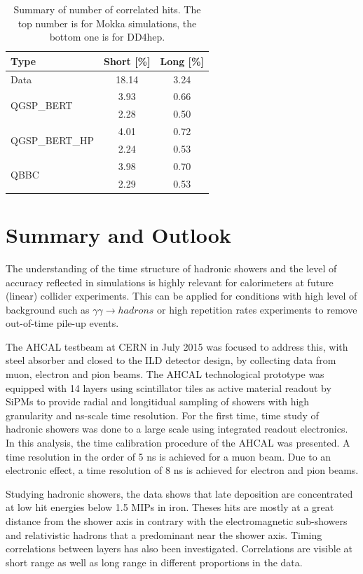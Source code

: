 \begin{table}[htb!]
	\centering
	\caption{Summary of number of correlated hits. The top number is for Mokka simulations, the bottom one is for DD4hep.}
	\label{table:Correlation_DataSim}
	\begin{tabular}{@{} |l|cc| @{}}
		\hline
		Type & Short [\%] & Long [\%] \\
		\hline
		Data & 18.14 & 3.24\\
		\hline
		\multirow{2}{*}{QGSP\_BERT} & 3.93 & 0.66\\ & 2.28 & 0.50\\
		\hline
		\multirow{2}{*}{QGSP\_BERT\_HP} & 4.01 & 0.72\\ & 2.24 & 0.53\\
		\hline
		\multirow{2}{*}{QBBC} & 3.98 & 0.70\\ & 2.29 & 0.53\\
		\hline
	\end{tabular}
\end{table}

\section{Summary and Outlook}

The understanding of the time structure of hadronic showers and the level of accuracy reflected in \geant simulations is highly relevant for calorimeters at future (linear) collider experiments. This can be applied for conditions with high level of background such as $\gamma\gamma \rightarrow hadrons$ or high repetition rates experiments to remove out-of-time pile-up events.

The AHCAL testbeam at CERN in July 2015 was focused to address this, with steel absorber and closed to the ILD detector design, by collecting data from muon, electron and pion beams. The AHCAL technological prototype was equipped with 14 layers using scintillator tiles as active material readout by SiPMs to provide radial and longitidual sampling of showers with high granularity and ns-scale time resolution. For the first time, time study of hadronic showers was done to a large scale using integrated readout electronics.
In this analysis, the time calibration procedure of the AHCAL was presented. A time resolution in the order of 5 ns is achieved for a muon beam. Due to an electronic effect, a time resolution of 8 ns is achieved for electron and pion beams.

Studying hadronic showers, the data shows that late deposition are concentrated at low hit energies below 1.5 MIPs in iron. Theses hits are mostly at a great distance from the shower axis in contrary with the electromagnetic sub-showers and relativistic hadrons that a predominant near the shower axis. Timing correlations between layers has also been investigated. Correlations are visible at short range as well as long range in different proportions in the data.

